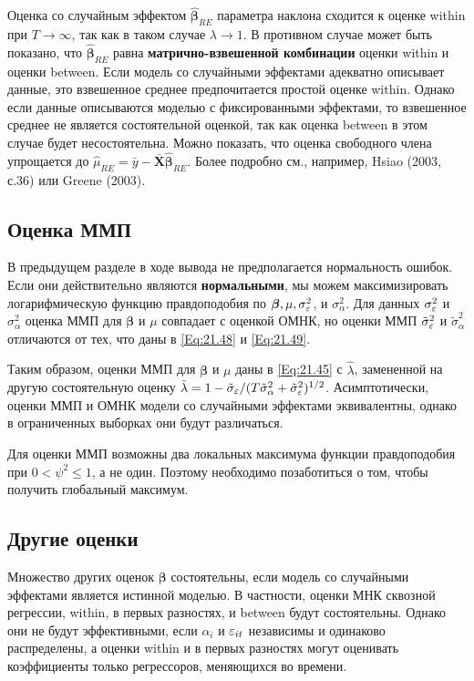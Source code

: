 Оценка со случайным эффектом $\hat{\bm\beta}_{RE}$ параметра наклона сходится к оценке within при $T \rightarrow \infty$, так как в таком случае $\lambda \rightarrow 1$. В противном случае может быть показано, что $\hat{\bm\beta}_{RE}$ равна \textbf{матрично-взвешенной комбинации} оценки within и оценки between. Если модель со случайными эффектами адекватно описывает данные, это взвешенное среднее предпочитается простой оценке within. Однако если данные описываются  моделью с фиксированными эффектами, то взвешенное среднее не является состоятельной оценкой, так как оценка between в этом случае будет несостоятельна. Можно показать, что оценка свободного члена упрощается до $\hat{\mu}_{RE}=\bar{y}-\bar{\mathbf X}\hat{\bm\beta}_{RE}$. Более подробно см., например, Hsiao (2003, с.36) или Greene (2003).


\subsection{Оценка ММП}

В предыдущем разделе в ходе вывода не предполагается нормальность ошибок. Если они действительно являются \textbf{нормальными}, мы можем максимизировать логарифмическую функцию правдоподобия по $\bm\beta, \mu, \sigma^2_\varepsilon$, и $\sigma^2_{\alpha}$. Для данных  $\sigma^2_\varepsilon$ и $\sigma^2_{\alpha}$ оценка ММП для $\bm\beta$  и $\mu$ совпадает с оценкой ОМНК, но оценки ММП $\tilde{\sigma}^2_\varepsilon$ и $\tilde{\sigma}^2_{\alpha}$ отличаются от тех, что даны в \ref{Eq:21.48} и \ref{Eq:21.49}. 

Таким образом, оценки ММП для $\bm\beta$ и $\mu$ даны в \ref{Eq:21.45} с $\hat{\lambda}$, замененной на другую состоятельную оценку $\tilde{\lambda}=1-\tilde{\sigma}_\varepsilon/(T\tilde{\sigma}^2_\alpha+\tilde{\sigma}^2_\varepsilon)^{1/2}$. Асимптотически, оценки ММП и ОМНК модели со случайными эффектами эквивалентны, однако в ограниченных выборках они будут различаться.

Для оценки ММП возможны два локальных максимума функции правдоподобия при $0 < \psi^2 \leq 1$, а не один. Поэтому необходимо позаботиться о том, чтобы получить глобальный максимум.


\subsection{Другие оценки}

Множество других оценок $\bm\beta$ состоятельны, если модель со случайными эффектами является истинной моделью. В частности, оценки МНК сквозной регрессии, within, в первых разностях, и between будут состоятельны. Однако они не будут эффективными, если $\alpha_i$ и $\varepsilon_{it}$ независимы и одинаково распределены, а оценки within и в первых разностях могут оценивать коэффициенты только  регрессоров, меняющихся во времени.

